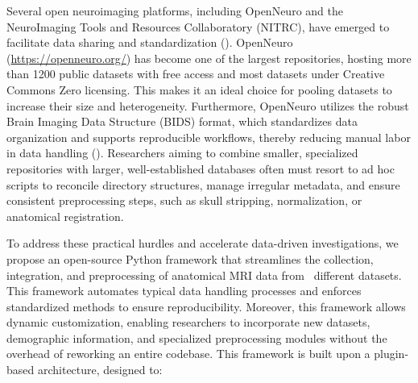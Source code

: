 Several open neuroimaging platforms, including OpenNeuro and the NeuroImaging Tools and Resources Collaboratory (NITRC),
have emerged to facilitate data sharing and standardization (\cite{markiewicz2021openneuro, buccigrossi2008neuroimaging}).
OpenNeuro (\url{https://openneuro.org/}) has become one of the largest repositories, hosting more than 1200 public 
datasets with free access and most datasets under Creative Commons Zero licensing. This makes it an ideal choice for 
pooling datasets to increase their size and heterogeneity. 
Furthermore, OpenNeuro utilizes the robust Brain Imaging Data Structure (BIDS) format, which standardizes data 
organization and supports reproducible workflows, thereby reducing manual labor in data handling (\cite{markiewicz2021openneuro}). 
Researchers aiming to combine smaller, specialized repositories with larger, well-established databases often must 
resort to ad hoc scripts to reconcile directory structures, manage irregular metadata, and ensure consistent preprocessing 
steps, such as skull stripping, normalization, or anatomical registration.


To address these practical hurdles and accelerate data-driven investigations, we propose an open-source Python framework 
that streamlines the collection, integration, and preprocessing of anatomical MRI data from \NumDatasets\ different datasets. 
This framework automates typical data handling processes and enforces standardized methods to ensure reproducibility.
Moreover, this framework allows dynamic customization, enabling researchers to incorporate new datasets, demographic information, 
and specialized preprocessing modules without the overhead of reworking an entire codebase.
This framework is built upon a plugin-based architecture, designed to:


